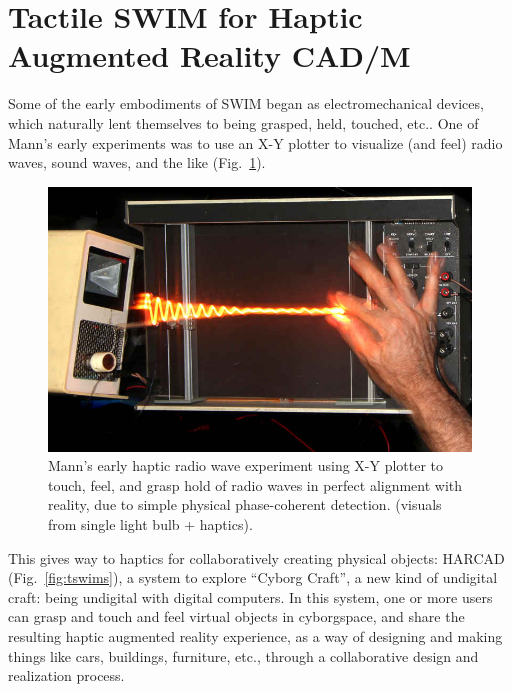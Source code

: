 \documentclass{sigchi-ext}
\begin{document}

\section{Tactile SWIM for Haptic Augmented Reality CAD/M}
Some of the early embodiments of SWIM began as electromechanical devices,
which naturally lent themselves to being grasped, held, touched, etc..
One of Mann's early experiments was to use an X-Y plotter to visualize
(and feel) radio waves, sound waves, and the like
(Fig.~\ref{fig:plotter}).
\begin{figure}
  \includegraphics[width=\linewidth]{tswim_XYplotter_cp_lowres.jpg}
  \caption{Mann's early haptic radio wave experiment using X-Y plotter
           to touch, feel, and grasp hold of radio waves in perfect alignment
           with reality, due to simple physical phase-coherent detection.
 (visuals from single light bulb + haptics).
          }
  \label{fig:plotter}
\end{figure}
This gives way to haptics for collaboratively creating physical objects:
HARCAD
(Fig.~\ref{fig:tswims}),
a system to
explore ``Cyborg Craft'', a new kind of undigital craft: being undigital
with digital computers.
In this system, one or more users can grasp and touch and feel virtual
objects in cyborgspace, and share the resulting haptic augmented reality
experience, as a way of designing and making things like cars,
buildings, furniture, etc., through a collaborative design and
realization process.
\end{document}
